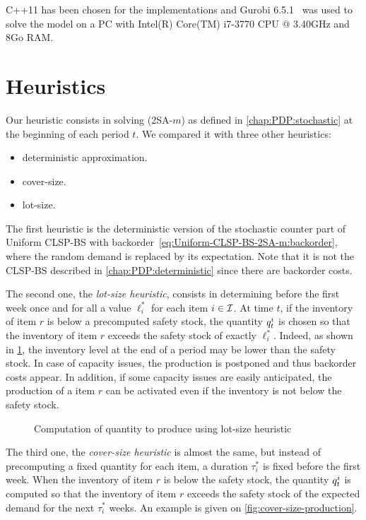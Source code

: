 C++11 has been chosen for the implementations and Gurobi 6.5.1~\cite{gurobi} was used to solve the model on a PC with Intel(R) Core(TM) i7-3770 CPU @ 3.40GHz and 8Go RAM.




\section{Heuristics}


Our heuristic consists in solving (2SA-$m$) as defined in \cref{chap:PDP:stochastic} at the beginning of each period $t$. We compared it with three other heuristics:
\begin{itemize}
  \item deterministic approximation.
  \item cover-size.
  \item lot-size.
\end{itemize}


The first heuristic is the deterministic version of the stochastic counter part of Uniform CLSP-BS with backorder~\eqref{eq:Uniform-CLSP-BS-2SA-m:backorder}, where the random demand is replaced by its expectation. Note that it is not the CLSP-BS described in \cref{chap:PDP:deterministic} since there are backorder costs.


The second one, the {\em lot-size heuristic}, consists in determining before the first week once and for all a value $\ell_i^*$ for each item $i\in\mathcal{I}$.
At time $t$, if the inventory of item $r$ is below a precomputed safety stock, the quantity $q_t^i$ is chosen so that the inventory of item $r$ exceeds the safety stock of exactly $\ell_i^*$.
Indeed, as shown in \cref{fig:lot-size-production}, the inventory level at the end of a period may be lower than the safety stock.
In case of capacity issues, the production is postponed and thus backorder costs appear. In addition, if some capacity issues are easily anticipated, the production of a item $r$ can be activated even if the inventory is not below the safety stock.

\begin{figure}[h]
  \centering
  \caption{Computation of quantity to produce using lot-size heuristic}
  \label{fig:lot-size-production}
\end{figure}


The third one, the {\em cover-size heuristic} is almost the same, but instead of precomputing a fixed quantity for each item, a duration $\tau_i^*$ is fixed before the first week. When the inventory of item $r$ is below the safety stock, the quantity $q_t^i$ is computed so that the inventory of item $r$ exceeds the safety stock of the expected demand for the next $\tau_i^*$ weeks. An example is given on \cref{fig:cover-size-production}.

